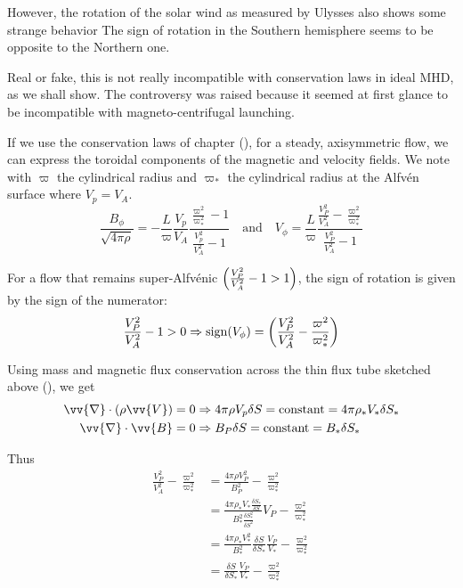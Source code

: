 \documentclass[10pt,a4paper,english]{article}
\let\originalleft\left
\let\originalright\right
\renewcommand{\left}{\mathopen{}\mathclose\bgroup\originalleft}
\renewcommand{\right}{\aftergroup\egroup\originalright}
\begin{document}
However, the rotation of the solar wind as measured by Ulysses also shows some
strange behavior The sign of rotation in the Southern hemisphere seems to be
opposite to the Northern one.

Real or fake, this is not really incompatible with conservation laws in ideal
MHD, as we shall show. The controversy was raised because it seemed at first
glance to be incompatible with magneto-centrifugal launching.


If we use the conservation laws of chapter (), for
a steady, axisymmetric flow, we can express the toroidal components of the
magnetic and velocity fields. We note with $\varpi$ the cylindrical radius and
$\varpi_*$ the cylindrical radius at the Alfvén surface where $V_p = V_A$.
\begin{equation}
    \frac{B_\phi}{\sqrt{4\pi\rho}} = - \frac{L}{\varpi}\frac{V_p}{V_A}\frac{\frac{\varpi^2}{\varpi_*^2}-1}{\frac{V_p^2}{V_A^2} - 1} \quad \mathrm{and} \quad
    V_\phi = \frac{L}{\varpi}\frac{\frac{V_P^2}{V_A^2} - \frac{\varpi^2}{\varpi_*^2}}{\frac{V_P^2}{V_A^2}-1}
\end{equation}

For a flow that remains super-Alfvénic $\left(\frac{V_P^2}{V_A^2}-1 >
1\right)$, the sign of rotation is given by the sign of the numerator:
\begin{equation}
    \frac{V_P^2}{V_A^2}- 1 > 0 \Rightarrow \mathrm{sign}\left( V_\phi \right) = \left( \frac{V_P^2}{V_A^2} - \frac{\varpi^2}{\varpi_*^2} \right)
\end{equation}

Using mass and magnetic flux conservation across the thin flux tube sketched
above (), we get
\begin{align}
    \vv{\nabla}\cdot \left( \rho\vv{V} \right) = 0 &\Rightarrow 4\pi\rho V_p\delta S = \mathrm{constant} = 4\pi\rho_*V_*\delta S_* \\
    \vv{\nabla}\cdot\vv{B} = 0 & \Rightarrow B_P \delta S = \mathrm{constant} = B_*\delta S_*
\end{align}

Thus
\begin{align}
    \frac{V_P^2}{V_A^2} - \frac{\varpi^2}{\varpi_*^2}
    & = \frac{4\pi\rho V_P^2}{B_P^2} - \frac{\varpi^2}{\varpi_*^2} \\
    & = \frac{4\pi\rho_*V_* \frac{\delta S_*}{\delta S}}{B_*^2 \frac{\delta S_*^2}{\delta S^2}}V_P - \frac{\varpi^2}{\varpi_*^2} \\
    & = \frac{4\pi\rho_*V_*^2}{B_*^2}\frac{\delta S}{\delta S_*} \frac{V_P}{V_*} - \frac{\varpi^2}{\varpi_*^2} \\
    & = \frac{\delta S}{\delta S_*} \frac{V_P}{V_*} - \frac{\varpi^2}{\varpi_*^2}
\end{align}
\end{document}
